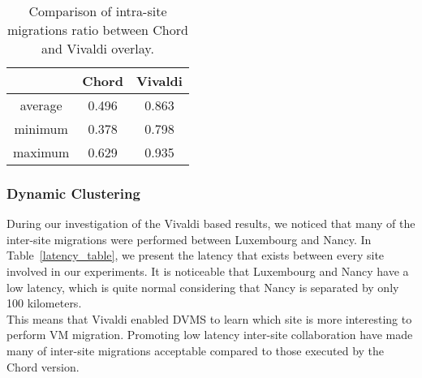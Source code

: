 \begin{table}

  \begin{center}
    \begin{tabular}{|c|c|c|}   

      \hline \multicolumn{1}{|p{3cm}|}{ }
       & \multicolumn{1}{|p{3cm}|}{\centering Chord }  & \multicolumn{1}{|p{3cm}|}{ \centering Vivaldi}  \\

      \hline
      average & 0.496 & 0.863 \\

      \hline
      minimum & 0.378 & 0.798 \\

      \hline
      maximum & 0.629 & 0.935 \\

      \hline
    \end{tabular}
  \end{center}
  \caption{\label{migration_table} Comparison of intra-site migrations ratio between Chord and Vivaldi overlay.}
\end{table}

\subsubsection{Dynamic Clustering}

During our investigation of the Vivaldi based results, we noticed that many of the
inter-site migrations were performed between Luxembourg and Nancy. In
Table~\ref{latency_table}, we present the latency that exists between every site involved
in our experiments. It is noticeable that Luxembourg and Nancy have a low latency, which
is quite normal considering that Nancy is separated by only 100 kilometers.
\\
This means that Vivaldi enabled DVMS to learn which site is more interesting to perform VM
migration. Promoting low latency inter-site collaboration have made many of inter-site
migrations acceptable compared to those executed by the Chord version.


